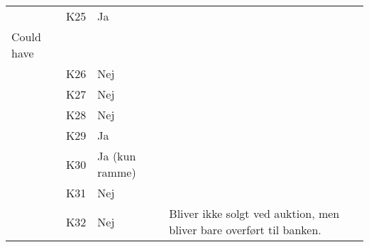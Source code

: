 \documentclass[class=article, crop=false]{standalone}
\begin{document}
\begin{table}[]
\begin{tabular}{llll}
            & K25            & Ja                 &                                                                                                                                                                                                    \\
            Could have      &                &                    &                                                                                                                                                                                                    \\
            & K26            & Nej                &                                                                                                                                                                                                    \\
            & K27            & Nej                &                                                                                                                                                                                                    \\
            & K28            & Nej                &                                                                                                                                                                                                    \\
            & K29            & Ja                 &                                                                                                                                                                                                    \\
            & K30            & Ja (kun ramme)     &                                                                                                                                                                                                    \\
            & K31            & Nej                &                                                                                                                                                                                                    \\
            & K32            & Nej                & Bliver ikke solgt ved auktion, men bliver bare overført til banken.                                                                                                                                \\

\end{tabular}
\end{table}
\end{document}
